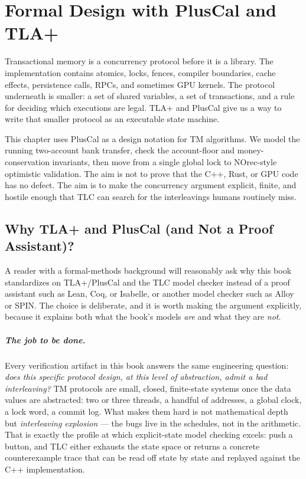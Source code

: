 \chapter{Formal Design with PlusCal and TLA+}

Transactional memory is a concurrency protocol before it is a library.  The
implementation contains atomics, locks, fences, compiler boundaries, cache
effects, persistence calls, RPCs, and sometimes GPU kernels.  The protocol
underneath is smaller: a set of shared variables, a set of transactions, and a
rule for deciding which executions are legal.  TLA+ and PlusCal give us a way
to write that smaller protocol as an executable state machine.

This chapter uses PlusCal as a design notation for TM algorithms.  We model the
running two-account bank transfer, check the account-floor and
money-conservation invariants, then move from a single global lock to NOrec-style
optimistic validation.  The aim is not to prove that the C++, Rust, or GPU code
has no defect.  The aim is to make the concurrency argument explicit, finite,
and hostile enough that TLC can search for the interleavings humans routinely
miss.

\section{Why TLA+ and PlusCal (and Not a Proof Assistant)?}
\label{sec:why-tla}

A reader with a formal-methods background will reasonably ask why this book
standardizes on TLA+/PlusCal and the TLC model checker instead of a proof
assistant such as Lean, Coq, or Isabelle, or another model checker such as
Alloy or SPIN.  The choice is deliberate, and it is worth making the argument
explicitly, because it explains both what the book's models \emph{are} and what
they are \emph{not}.

\paragraph{The job to be done.}  Every verification artifact in this book
answers the same engineering question: \emph{does this specific protocol
design, at this level of abstraction, admit a bad interleaving?}  TM protocols
are small, closed, finite-state systems once the data values are abstracted:
two or three threads, a handful of addresses, a global clock, a lock word, a
commit log.  What makes them hard is not mathematical depth but
\emph{interleaving explosion} --- the bugs live in the schedules, not in the
arithmetic.  That is exactly the profile at which explicit-state model checking
excels: push a button, and TLC either exhausts the state space or returns a
concrete counterexample trace that can be read off state by state and replayed
against the C++ implementation.

